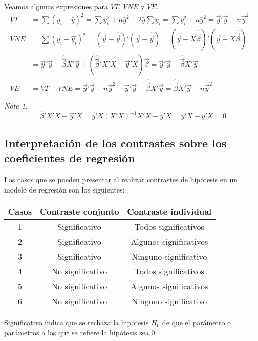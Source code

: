 \documentclass{report}
\theoremstyle{remark}
\theoremstyle{remark}
\newtheorem*{note}{Nota}
\theoremstyle{remark}
\theoremstyle{definition}
\theoremstyle{definition}
\theoremstyle{definition}
\begin{document}
Veamos algunas expresiones para $VT$, $VNE$ y $VE$.
\begin{align*}
    VT  & = \sum (y_i - \bar{y})^2 = \sum y_i^2 + n\bar{y}^2 - 2\bar{y}\sum y_i = \sum y_i^2 + n\bar{y}^2 = \vec{y}'\vec{y} - n\vec{y}^2                     \\
    VNE & = \sum (y_i - \hat{y_i})^2 = (\vec{y} - \hat{\vec{y}})'(\vec{y} - \hat{\vec{y}}) = (\vec{y} - X\hat{\vec{\beta}})'(\vec{y} - X\hat{\vec{\beta}}) = \\
        & = \vec{y}'\vec{y} - \hat{\vec{\beta}}X'\vec{y} + (\hat{\vec{\beta}}'X'X - \vec{y}'X)\vec{\beta} = \vec{y}'\vec{y} - \hat{\vec{\beta}}X'\vec{y}     \\
    VE  & = VT - VNE = \vec{y}'\vec{y} - n\vec{y}^2 - \vec{y}'\vec{y} + \hat{\vec{\beta}}X'\vec{y} = \hat{\vec{\beta}}X'\vec{y} - n\vec{y}^2
\end{align*}

\begin{note}
    $$\hat{\beta}'X'X - \vec{y}'X = y'X(X'X)^{-1}X'X - y'X = y'X - y'X = 0$$
\end{note}

\subsection*{Interpretación de los contrastes sobre los coeficientes de regresión}
Los casos que se pueden presentar al realizar contrastes de hipótesis en un modelo de regresión son los siguientes:
\begin{center}
    \begin{tabular}{ c | c | c }
        Casos & Contraste conjunto & Contraste individual   \\
        \hline
        1     & Significativo      & Todos significativos   \\
        2     & Significativo      & Algunos significativos \\
        3     & Significativo      & Ninguno significativo  \\
        4     & No significativo   & Todos significativos   \\
        5     & No significativo   & Algunos significativos \\
        6     & No significativo   & Ninguno significativo  \\
    \end{tabular}
\end{center}
Significativo indica que se rechaza la hipótesis $H_0$ de que el parámetro o parámetros a los que se refiere la hipótesis sea 0.
\end{document}
